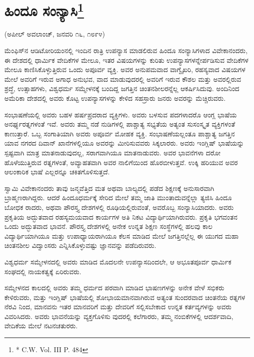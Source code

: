 \delimiter


\section[ಹಿಂದೂ ಸಂನ್ಯಾಸಿ]{ಹಿಂದೂ ಸಂನ್ಯಾಸಿ\protect\footnote{* C.W. Vol. III P. 484}}

\begin{center}
(ಅಪೀಲ್​ ಅವಲಾಂಚ್​, ಜನವರಿ ೧೬, ೧೮೯೪)
\end{center}

ಮೆಂಫಿಸ್​ನ ಆಡಿಟೋರಿಯಂನಲ್ಲಿ ಇಂದಿನ ರಾತ್ರಿ ಉಪನ್ಯಾಸ ಮಾಡಲಿರುವ ಹಿಂದೂ ಸಂನ್ಯಾಸಿಗಳಾದ ವಿವೇಕಾನಂದರು, ಈ ದೇಶದಲ್ಲಿ ಧಾರ್ಮಿಕ ವೇದಿಕೆಗಳ ಮೇಲೂ, ಇತರ ವಿಷಯಗಳನ್ನು ಕುರಿತು ಉಪನ್ಯಾಸಗಳನ್ನೇರ್ಪಡಿಸುವ ವೇದಿಕೆಗಳ ಮೇಲೂ ಕಾಣಿಸಿಕೊಳ್ಳುತ್ತಿರುವ ಒಂದು ಅಪೂರ್ವ ವ್ಯಕ್ತಿ. ಅವರ ಅನುಪಮವಾದ ವಾಗ್ವೈಖರಿ, ರಹಸ್ಯವಾದ ವಿಷಯಗಳ ಮೇಲೆ ಅವರಿಗೆ ಇರುವ ಅಗಾಧ ಅನುಭವ, ವಾದ ಮಾಡುವುದರಲ್ಲಿ ಅವರಿಗೆ ಇರುವ ಕೌಶಲ ಮತ್ತು ಅವರಲ್ಲಿರುವ ಶ್ರದ್ಧೆ, ಉತ್ಸಾಹಗಳು, ವಿಶ್ವಧರ್ಮ ಸಮ್ಮೇಳನಕ್ಕೆ ಬಂದಿದ್ದ ಜಗತ್ತಿನ ಚಿಂತನಶೀಲರನ್ನೆಲ್ಲ ಆಕರ್ಷಿಸಿದುವು. ಅಂದಿನಿಂದ ಅಮೆರಿಕಾ ದೇಶದಲ್ಲಿ ಅವರು ಕೊಟ್ಟ ಉಪನ್ಯಾಸಗಳನ್ನು ಕೇಳಿದ ಸಹಸ್ರಾರು ಜನರು ಅವರನ್ನು ಮೆಚ್ಚಿರುವರು.

ಸಂಭಾಷಣೆಯಲ್ಲಿ ಅವರು ಬಹಳ ಹರ್ಷಪ್ರದರಾದ ವ್ಯಕ್ತಿಗಳು. ಅವರು ಬಳಸುವ ಪದಗಳಾದರೊ ಆಂಗ್ಲ ಭಾಷೆಯ ಅನರ್ಘ್ಯರತ್ನಗಳಂತೆ ಇವೆ. ಅವರು ತಮ್ಮ ನಡೆ ನುಡಿಗಳಲ್ಲಿ ಪಾಶ್ಚಾತ್ಯ ಸಭ್ಯತೆಯ ಅತ್ಯಂತ ಸುಸಂಸ್ಕೃತ ವ್ಯಕ್ತಿಗಳಂತೆ ಕಾಣುತ್ತಾರೆ. ಒಬ್ಬ ಸಂಗಾತಿಯಾಗಿ ಅವರು ಅಪೂರ್ವ ಮೋಹಕ ವ್ಯಕ್ತಿ. ಸಂಭಾಷಣೆಯಲ್ಲಂತೂ ಪಾಶ್ಚಾತ್ಯ ಜಗತ್ತಿನ ಯಾವ ನಗರದ ದಿವಾನ್​ ಖಾನೆಗಳಲ್ಲಿಯೂ ಅವರನ್ನು ಮೀರಿಸುವವರು ಸಿಕ್ಕಲಾರರು. ಅವರು ಇಂಗ್ಲಿಷ್​ ಭಾಷೆಯನ್ನು ಸ್ಪಷ್ಟವಾಗಿ ಮಾತ್ರ ಮಾತನಾಡುವುದಲ್ಲ, ಸರಾಗವಾಗಿಯೂ ಮಾತನಾಡುವರು. ಅವರ ಭಾವನೆಗಳಾ ದರೋ ಹೊಳೆಯುತ್ತಿರುವ ರತ್ನಗಳಂತೆ, ಅವ್ಯಾಹತವಾಗಿ ಅವರ ನಾಲಿಗೆಯಿಂದ ಹೊರಬೀಳುತ್ತವೆ. ಉಕ್ಕಿ ಹರಿಯುವ ಅವರ ಆಲಂಕಾರಿಕ ಭಾಷೆ ಎಲ್ಲರನ್ನೂ ಚಕಿತಗೊಳಿಸುತ್ತದೆ.

ಸ್ವಾಮಿ ವಿವೇಕಾನಂದರು ತಾವು ಜನ್ಮವೆತ್ತಿದ ಮತ ಅಥವಾ ಬಾಲ್ಯದಲ್ಲಿ ಪಡೆದ ಶಿಕ್ಷಣಕ್ಕೆ ಅನುಸಾರವಾಗಿ ಬ್ರಾಹ್ಮಣರಾಗಿದ್ದರು. ಆದರೆ ಹಿಂದೂಧರ್ಮಕ್ಕೆ ಸೇರಿದ ಮೇಲೆ ತಮ್ಮ ಜಾತಿ ಮುಂತಾದುವನ್ನೆಲ್ಲಾ ತ್ಯಜಿಸಿ ಹಿಂದೂ ಬೋಧಕ ರಾದರು, ಅಥವಾ ಪೌರಸ್ತ್ಯ ದೇಶಗಳಲ್ಲಿ ರೂಢಿಯಲ್ಲಿರುವಂತೆ, ಅವರೊಬ್ಬ ಸಂನ್ಯಾಸಿಯಾದರು. ಅವರು ಪ್ರಕೃತಿಯ ಅದ್ಭುತವಾದ ರಹಸ್ಯಮಯವಾದ ಕಾರ್ಯಗಳ ಅತಿ ನಿಕಟ ವಿದ್ಯಾರ್ಥಿಯಾಗಿರುವರು. ಪ್ರಕೃತಿ ಭಗವಂತನ ಒಂದು ಅದ್ಭುತವಾದ ಭಾವನೆ. ಪೌರಸ್ತ್ಯ ದೇಶಗಳಲ್ಲಿ ಅನೇಕ ಉನ್ನತ ಶಿಕ್ಷಣ ಸಂಸ್ಥೆಗಳಲ್ಲಿ ಹಲವು ಕಾಲ ವಿದ್ಯಾರ್ಥಿಯಾಗಿಯೂ ಮತ್ತು ಉಪಾಧ್ಯಾಯರಾಗಿಯೂ ಕೆಲಸ ಮಾಡಿದ ಮೇಲೆ ಜಗತ್ತಿನಲ್ಲೆಲ್ಲ ಈ ಯುಗದ ಮಹಾ ಚಿಂತನಶೀಲ ವಿದ್ವಾಂಸರು ಎನ್ನಿಸಿಕೊಳ್ಳುವಷ್ಟು ಜ್ಞಾನವನ್ನು ಪಡೆದಿರುವರು.

ವಿಶ್ವಧರ್ಮ ಸಮ್ಮೇಳನದಲ್ಲಿ ಅವರು ಮಾಡಿದ ಮೊದಲನೇ ಉಪನ್ಯಾಸದಿಂದಲೇ, ಆ ಅಭೂತಪೂರ್ವ ಧಾರ್ಮಿಕ ಸಂಘದಲ್ಲಿ ನಾಯಕತ್ವಕ್ಕೆ ಏರಿರುವರು.

ಸಮ್ಮೇಳನದ ಕಾಲದಲ್ಲಿ ಅವರು ತಮ್ಮ ಧರ್ಮದ ಪರವಾಗಿ ಮಾಡಿದ ಭಾಷಣಗಳನ್ನು ಅನೇಕ ವೇಳೆ ಸಭಿಕರು ಕೇಳಿರುವರು, ಮತ್ತು ಇಂಗ್ಲಿಷ್​ ಭಾಷೆಯಲ್ಲಿ ಶೋಭಾಯಮಾನವಾಗಿರುವ ಅತ್ಯಂತ ಸುಂದರವಾದ ಚಿಂತನೆಯ ರತ್ನಗಳ ನೆರವಿ ನಿಂದ, ಮಾನವನು ಇತರ ಮಾನವರಿಗೆ ಮತ್ತು ದೇವರಿಗೆ ಸಲ್ಲಿಸಬೇಕಾದ ಉನ್ನತ ಕರ್ತವ್ಯಗಳನ್ನು ಅವರು ವಿವರಿಸಿದರು. ಅವರು ಭಾವನೆಯನ್ನು ವ್ಯಕ್ತಗೊಳಿಸು ವುದರಲ್ಲಿ ಕಲೆಗಾರರು, ತಮ್ಮ ನಂಬಿಕೆಗಳಲ್ಲಿ ಆದರ್ಶವಾದಿ, ವೇದಿಕೆಯ ಮೇಲೆ ನಟನಚತುರರು.

